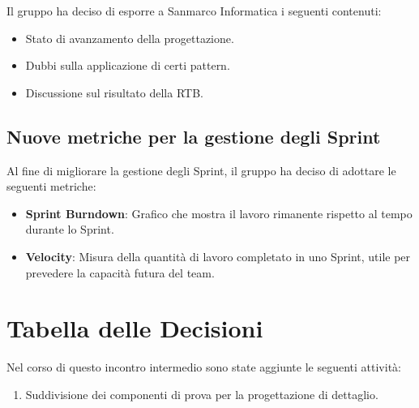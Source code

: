 \documentclass[a4paper,12pt]{article}
\begin{document}
Il gruppo ha deciso di esporre a Sanmarco Informatica i seguenti contenuti:
\begin{itemize}[noitemsep]
    \item Stato di avanzamento della progettazione.
    \item Dubbi sulla applicazione di certi pattern.
    \item Discussione sul risultato della RTB.
\end{itemize}

\subsection{Nuove metriche per la gestione degli Sprint}
Al fine di migliorare la gestione degli Sprint, il gruppo ha deciso di adottare le seguenti metriche:
\begin{itemize}[noitemsep]
    \item \textbf{Sprint Burndown}: Grafico che mostra il lavoro rimanente rispetto al tempo durante lo Sprint.
    \item \textbf{Velocity}: Misura della quantità di lavoro completato in uno Sprint, utile per prevedere la capacità futura del team.
\end{itemize}
\section{Tabella delle Decisioni}

Nel corso di questo incontro intermedio sono state aggiunte le seguenti attività:
\begin{enumerate}[noitemsep]
    \item Suddivisione dei componenti di prova per la progettazione di dettaglio.
\end{enumerate}

\vspace{0.5cm}
\end{document}
